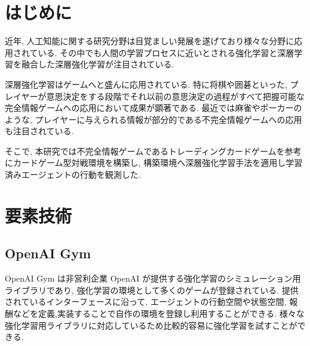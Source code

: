 \documentclass[twocolumn]{jarticle}
\begin{document}

\section{はじめに}
近年, 人工知能に関する研究分野は目覚ましい発展を遂げており様々な分野に応用されている. その中でも人間の学習プロセスに近いとされる強化学習と深層学習を融合した深層強化学習が注目されている.\par
深層強化学習はゲームへと盛んに応用されている.
特に将棋や囲碁といった, プレイヤーが意思決定をする段階でそれ以前の意思決定の過程がすべて把握可能な完全情報ゲームへの応用において成果が顕著である. 
最近では麻雀やポーカーのような, プレイヤーに与えられる情報が部分的である不完全情報ゲームへの応用も注目されている.
\par
そこで, 本研究では不完全情報ゲームであるトレーディングカードゲームを参考にカードゲーム型対戦環境を構築し, 構築環境へ深層強化学習手法を適用し学習済みエージェントの行動を観測した. 

\section{要素技術}

\subsection{OpenAI Gym}
OpenAI Gym \cite{OpenAIGym} は非営利企業 OpenAI が提供する強化学習のシミュレーション用ライブラリであり, 強化学習の環境として多くのゲームが登録されている. 提供されているインターフェースに沿って, エージェントの行動空間や状態空間, 報酬などを定義,実装することで自作の環境を登録し利用することができる. 様々な強化学習用ライブラリに対応しているため比較的容易に強化学習を試すことができる.
\end{document}
